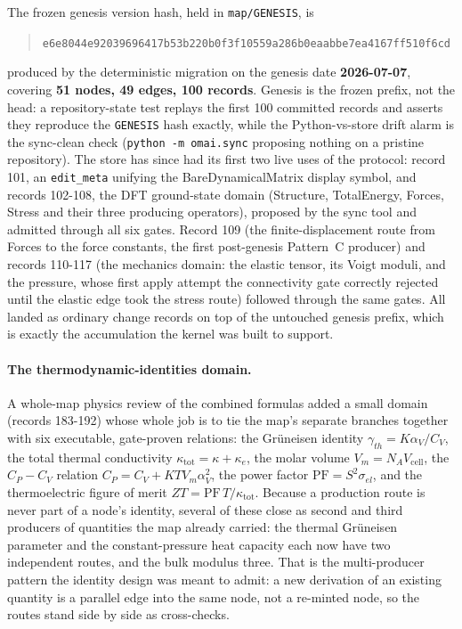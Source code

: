 \documentclass[11pt,a4paper]{article}
\begin{document}
The frozen genesis version hash, held in \texttt{map/GENESIS}, is
\begin{quote}
\texttt{e6e8044e92039696417b53b220b0f3f10559a286b0eaabbe7ea4167ff510f6cd}
\end{quote}
produced by the deterministic migration on the genesis date \textbf{2026-07-07},
covering \textbf{51 nodes, 49 edges, 100 records}. Genesis is the frozen prefix,
not the head: a repository-state test replays the first 100 committed records and
asserts they reproduce the \texttt{GENESIS} hash exactly, while the
Python-vs-store drift alarm is the sync-clean check (\texttt{python -m omai.sync}
proposing nothing on a pristine repository). The store has since had its first
two live uses of the protocol: record 101, an \texttt{edit\_meta} unifying the
BareDynamicalMatrix display symbol, and records 102-108, the DFT ground-state
domain (Structure, TotalEnergy, Forces, Stress and their three producing
operators), proposed by the sync tool and admitted through all six gates.
Record 109 (the finite-displacement route from Forces to the force constants,
the first post-genesis Pattern~C producer) and records 110-117 (the mechanics
domain: the elastic tensor, its Voigt moduli, and the pressure, whose first
apply attempt the connectivity gate correctly rejected until the elastic edge
took the stress route) followed through the same gates. All
landed as ordinary change records on top of the untouched genesis prefix, which
is exactly the accumulation the kernel was built to support.

\paragraph{The thermodynamic-identities domain.} A whole-map physics review of the
combined formulas added a small domain (records 183-192) whose whole job is to tie
the map's separate branches together with six executable, gate-proven relations:
the Gr\"uneisen identity $\gamma_{th} = K \alpha_V / C_V$, the total thermal
conductivity $\kappa_{\mathrm{tot}} = \kappa + \kappa_e$, the molar volume
$V_m = N_A V_{\mathrm{cell}}$, the $C_P - C_V$ relation
$C_P = C_V + K T V_m \alpha_V^2$, the power factor $\mathrm{PF} = S^2 \sigma_{el}$,
and the thermoelectric figure of merit $ZT = \mathrm{PF}\,T / \kappa_{\mathrm{tot}}$.
Because a production route is never part of a node's identity, several of these
close as second and third producers of quantities the map already carried: the
thermal Gr\"uneisen parameter and the constant-pressure heat capacity each now have
two independent routes, and the bulk modulus three. That is the multi-producer
pattern the identity design was meant to admit: a new derivation of an existing
quantity is a parallel edge into the same node, not a re-minted node, so the
routes stand side by side as cross-checks.
\end{document}
